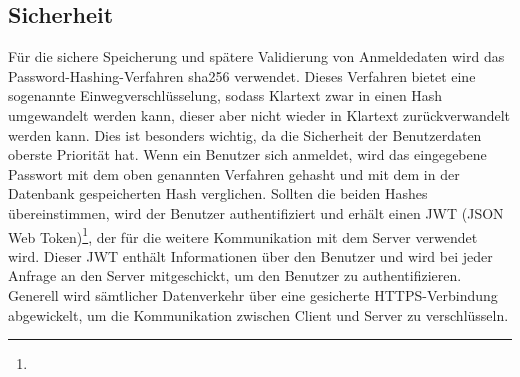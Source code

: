 \documentclass[main.tex]{subfiles}
\begin{document}
    \subsection{Sicherheit}
    Für die sichere Speicherung und spätere Validierung von Anmeldedaten wird das Password-Hashing-Verfahren sha256 verwendet.
    Dieses Verfahren bietet eine sogenannte Einwegverschlüsselung, sodass Klartext zwar in einen Hash umgewandelt werden kann, dieser aber nicht wieder in Klartext zurückverwandelt werden kann.
    Dies ist besonders wichtig, da die Sicherheit der Benutzerdaten oberste Priorität hat.
    Wenn ein Benutzer sich anmeldet, wird das eingegebene Passwort mit dem oben genannten Verfahren gehasht und mit dem in der Datenbank gespeicherten Hash verglichen.
    Sollten die beiden Hashes übereinstimmen, wird der Benutzer authentifiziert und erhält einen JWT (JSON Web Token)\footnote{}, der für die weitere Kommunikation mit dem Server verwendet wird.
    Dieser JWT enthält Informationen über den Benutzer und wird bei jeder Anfrage an den Server mitgeschickt, um den Benutzer zu authentifizieren.
    Generell wird sämtlicher Datenverkehr über eine gesicherte HTTPS-Verbindung abgewickelt, um die Kommunikation zwischen Client und Server zu verschlüsseln.
\end{document}
